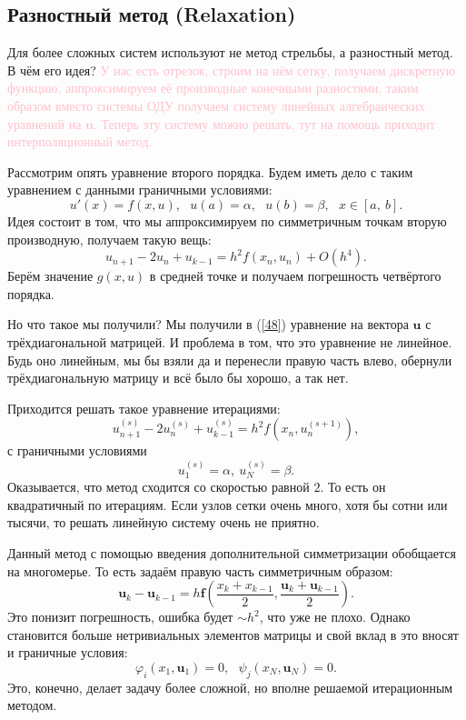 \documentclass[a4,14pt,russian]{article}
\begin{document}
\subsection{Разностный метод (Relaxation)}
    Для более сложных систем используют не метод стрельбы, а разностный метод. В чём его идея? \textcolor{pink}{У нас есть отрезок, строим на нём сетку, получаем дискретную функцию, аппроксимируем её производные конечными разностями, таким образом вместо системы ОДУ получаем систему линейных алгебраических уравнений на $\boldsymbol u$. Теперь эту систему можно решать, тут на помощь приходит интерполяционный метод.}\par
    Рассмотрим опять уравнение второго порядка. Будем иметь дело с таким уравнением с данными граничными условиями:
    \begin{equation}
     u'(x) = f(x, u),\ \ \ u(a)=\alpha,\ \ \ u(b) = \beta, \ \ \ x \in [a,\ b].
    \end{equation}
    Идея состоит в том, что мы аппроксимируем по симметричным точкам вторую производную, получаем такую вещь:
    \begin{equation}\label{48}
     u_{n+1} - 2 u_n + u_{k-1} = h^2f(x_n, u_n) + O(h^4).
    \end{equation}
    Берём значение $g(x, u)$ в средней точке и получаем погрешность четвёртого порядка.\par
    Но что такое мы получили? Мы получили в (\ref{48}) уравнение на вектора $\boldsymbol u$ с трёхдиагональной матрицей. И проблема в том, что это уравнение не линейное. Будь оно линейным, мы бы взяли да и перенесли правую часть влево, обернули трёхдиагональную матрицу и всё было бы хорошо, а так нет.\par
    Приходится решать такое уравнение итерациями:
    \begin{equation}
     u_{n+1}^{(s)} - 2 u_n^{(s)} + u_{k-1}^{(s)} = h^2f(x_n, u_n^{(s+1)}),
    \end{equation}
    с граничными условиями$$u_1^{(s)}=\alpha,\ u_N^{(s)} = \beta.$$
    Оказывается, что метод сходится со скоростью равной $2$. То есть он квадратичный по итерациям. Если узлов сетки очень много, хотя бы сотни или тысячи, то решать линейную систему очень не приятно.\par
    Данный метод с помощью введения дополнительной симметризации обобщается на многомерье. То есть задаём правую часть симметричным образом:
    \begin{equation}
     \boldsymbol u_k - \boldsymbol u_{k-1} = h \boldsymbol f(\frac{x_k + x_{k-1}}{2}, \frac{\boldsymbol u_k + \boldsymbol u_{k-1}}2).
    \end{equation}
    Это понизит погрешность, ошибка будет $\sim h^2$, что уже не плохо. Однако становится больше нетривиальных элементов матрицы и свой вклад в это вносят и граничные условия:
    \begin{equation}
     \varphi_i (x_1,\boldsymbol u_1) = 0,\ \ \ \psi_j (x_N,\boldsymbol u_N) = 0.
    \end{equation}
    Это, конечно, делает задачу более сложной, но вполне решаемой итерационным методом.
\end{document}
